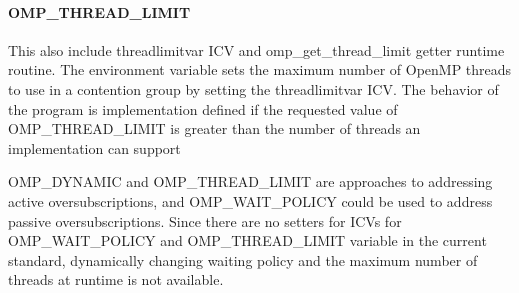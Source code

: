 \paragraph{OMP\_THREAD\_LIMIT}
 This also include threadlimitvar ICV and omp\_get\_thread\_limit getter runtime routine.
 The environment variable sets the maximum number of OpenMP threads to use in a contention group by setting the threadlimitvar ICV.
The behavior of the program is implementation defined if the requested value of OMP\_THREAD\_LIMIT is greater than the number of threads an implementation can support

OMP\_DYNAMIC and OMP\_THREAD\_LIMIT are approaches to
addressing active oversubscriptions, and OMP\_WAIT\_POLICY could be used to address
passive oversubscriptions. 
Since there are no setters for ICVs for OMP\_WAIT\_POLICY
and OMP\_THREAD\_LIMIT variable in the current standard, 
dynamically changing waiting policy and the maximum number of
threads at runtime is not available.
